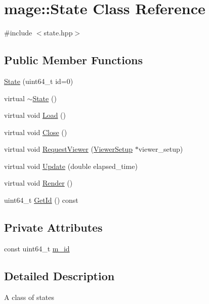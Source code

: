 \hypertarget{classmage_1_1_state}{}\section{mage\+:\+:State Class Reference}
\label{classmage_1_1_state}


{\ttfamily \#include $<$state.\+hpp$>$}

\subsection*{Public Member Functions}
\begin{DoxyCompactItemize}
\item 
\hyperlink{classmage_1_1_state_ac21bb6de22bb3b9c1b18d98b53e92100}{State} (uint64\+\_\+t id=0)
\item 
virtual \hyperlink{classmage_1_1_state_a8e5220ebfb74db1ed95f4d3b3ec8fb2d}{$\sim$\+State} ()
\item 
virtual void \hyperlink{classmage_1_1_state_aa88ace504c82ad372e5e599746f3ebda}{Load} ()
\item 
virtual void \hyperlink{classmage_1_1_state_a1edd5d756566f5b689c7a381f4e6b301}{Close} ()
\item 
virtual void \hyperlink{classmage_1_1_state_ab86748cfd13a65da65d3a639a0de2077}{Request\+Viewer} (\hyperlink{structmage_1_1_viewer_setup}{Viewer\+Setup} $\ast$viewer\+\_\+setup)
\item 
virtual void \hyperlink{classmage_1_1_state_afbee8caa84e0c69ac5757f7e5e87317f}{Update} (double elapsed\+\_\+time)
\item 
virtual void \hyperlink{classmage_1_1_state_a6e3b3f55bfd5be86a02783a2f76c9709}{Render} ()
\item 
uint64\+\_\+t \hyperlink{classmage_1_1_state_a07c383a809204ba12a2bbfb22d2977d5}{Get\+Id} () const
\end{DoxyCompactItemize}
\subsection*{Private Attributes}
\begin{DoxyCompactItemize}
\item 
const uint64\+\_\+t \hyperlink{classmage_1_1_state_ab135514ec2250e9680b35cfab4e91cab}{m\+\_\+id}
\end{DoxyCompactItemize}


\subsection{Detailed Description}
A class of states 

